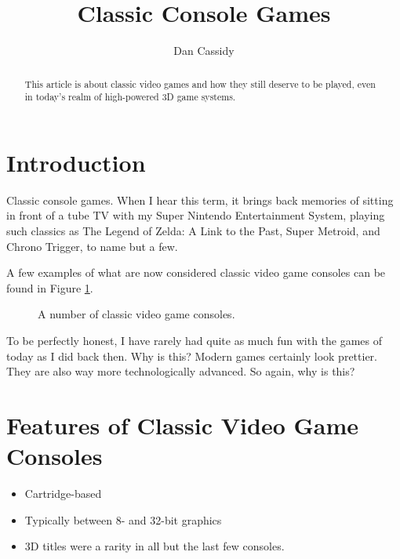 \documentclass{article}
\title{Classic Console Games}
\author{Dan Cassidy}
\begin{document}
\maketitle
\begin{abstract}
This article is about classic video games and how they still deserve to be played, even in today's realm of high-powered 3D game systems.
\end{abstract}
\section{Introduction}
Classic console games.  When I hear this term, it brings back memories of sitting in front of a tube TV with my Super Nintendo Entertainment System, playing such classics as The Legend of Zelda: A Link to the Past, Super Metroid, and Chrono Trigger, to name but a few.

A few examples of what are now considered classic video game consoles can be found in Figure \ref{fig1}.
\begin{figure}
\centering
{}
\caption{A number of classic video game consoles.}
\label{fig1}
\end{figure}

To be perfectly honest, I have rarely had quite as much fun with the games of today as I did back then.  Why is this?  Modern games certainly look prettier.  They are also way more technologically advanced.  So again, why is this?

\section{Features of Classic Video Game Consoles}
\begin{itemize}
\item{Cartridge-based}
\item{Typically between 8- and 32-bit graphics}
\item{3D titles were a rarity in all but the last few consoles.}
\end{itemize}
\end{document}

